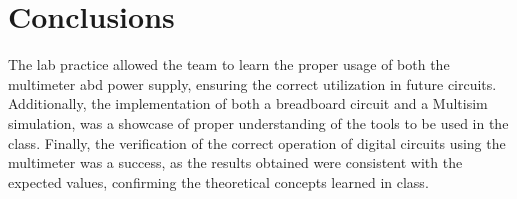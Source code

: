 \documentclass[12pt]{article}  %
\begin{document}
\section{Conclusions} %
The lab practice allowed the team to learn the proper usage of both the multimeter abd power supply, ensuring the correct utilization in future circuits.
Additionally, the implementation of both a breadboard circuit and a Multisim simulation, was a showcase of proper understanding of the tools to be used in the class.
Finally, the verification of the correct operation of digital circuits using the multimeter was a success, as the results obtained were consistent with the expected values, confirming the theoretical concepts learned in class.
\clearpage %
\end{document}

